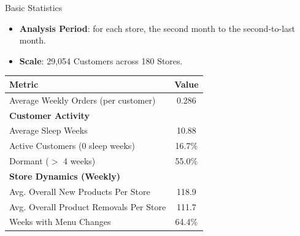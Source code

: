 \documentclass[aspectratio=169]{beamer}  %
\begin{document}
\begin{frame}{Basic Statistics}
    \begin{itemize}
        \item \textbf{Analysis Period}: for each store, the second month to the second-to-last month.
        \item \textbf{Scale}: 29,054 Customers across 180 Stores.
    \end{itemize}
\begin{table}[h]
    \centering
    \small
    \begin{tabular}{l c}
    \toprule
    \textbf{Metric} & \textbf{Value} \\
    \midrule
    Average Weekly Orders (per customer) & 0.286 \\
    \midrule
    \textbf{Customer Activity} & \\
    Average Sleep Weeks & 10.88 \\
    Active Customers (0 sleep weeks) & 16.7\% \\
    Dormant ($>$ 4 weeks) & 55.0\% \\
    \midrule
    \textbf{Store Dynamics (Weekly)} & \\
    Avg. Overall New Products Per Store & 118.9 \\
    Avg. Overall Product Removals Per Store & 111.7 \\
    Weeks with Menu Changes & 64.4\% \\
    \bottomrule
    \end{tabular}
\end{table}
\end{frame}
\end{document}
